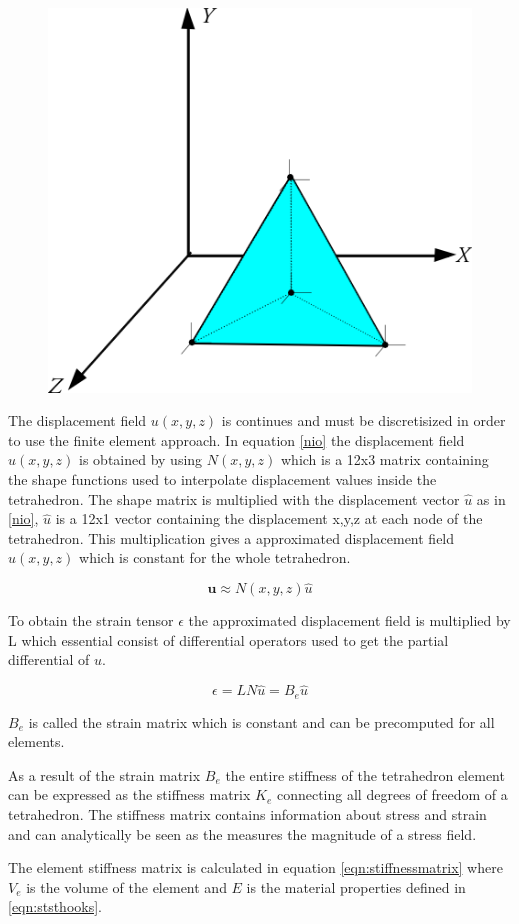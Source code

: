 \documentclass[10pt,a4paper]{article}
\begin{document}
\begin{figure}[h]
\centering
\includegraphics[width=.3\columnwidth]{figures/tetra_coord.png}
\caption{}
\label{fig:4}
\end{figure}

The displacement field $u(x,y,z)$ is continues and must be discretisized in order to use the finite element approach. In equation \ref{nio} the displacement field $u(x,y,z)$ is obtained by using $N(x,y,z)$ which is a 12x3 matrix containing the shape functions used to interpolate displacement values inside the tetrahedron. The shape matrix is multiplied with the displacement vector $\hat{u}$ as in \ref{nio}, $\hat{u}$ is a 12x1 vector containing the displacement x,y,z at each node of the tetrahedron. This multiplication gives a approximated displacement field $u(x,y,z)$ which is constant for the whole tetrahedron.

\begin{equation}\label{nio}
    \mathbf{u} \approx N(x,y,z) \hat{u}
\end{equation}

To obtain the strain tensor $\epsilon$ the approximated displacement field is multiplied by L which essential consist of differential operators used to get the partial differential of $u$.

\begin{equation}\label{tio}
    \epsilon = LN \hat{u} = B_ {e} \hat{u}
\end{equation}

$B_ {e}$ is called the strain matrix which is constant and can be precomputed for all elements.

As a result of the strain matrix $B_{e}$ the entire stiffness of the tetrahedron element can be expressed as the stiffness matrix $K_{e}$ connecting all degrees of freedom of a tetrahedron. The stiffness matrix contains information about stress and strain and can analytically be seen as the measures the magnitude of a stress field.

The element stiffness matrix is calculated in equation \ref{eqn:stiffnessmatrix} where $V_{e}$ is the volume of the element and $E$ is the material properties defined in \ref{eqn:ststhooks}.
\end{document}
